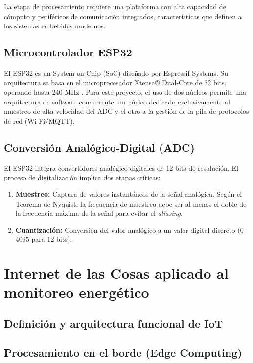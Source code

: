 ﻿\documentclass[12pt,openright,oneside]{report}
\theoremstyle{mytheoremstyle}
\theoremstyle{mytheoremstyle}
\theoremstyle{myproblemstyle}
\begin{document}
La etapa de procesamiento requiere una plataforma con alta capacidad de cómputo y periféricos de comunicación integrados, características que definen a los sistemas embebidos modernos.

\subsection{Microcontrolador ESP32}
El ESP32 es un System-on-Chip (SoC) diseñado por Espressif Systems. Su arquitectura se basa en el microprocesador Xtensa® Dual-Core de 32 bits, operando hasta 240 MHz \cite{esp32_datasheet}. Para este proyecto, el uso de dos núcleos permite una arquitectura de software concurrente: un núcleo dedicado exclusivamente al muestreo de alta velocidad del ADC y el otro a la gestión de la pila de protocolos de red (Wi-Fi/MQTT).

\subsection{Conversión Analógico-Digital (ADC)}
El ESP32 integra convertidores analógico-digitales de 12 bits de resolución. El proceso de digitalización implica dos etapas críticas:
\begin{enumerate}
    \item \textbf{Muestreo:} Captura de valores instantáneos de la señal analógica. Según el Teorema de Nyquist, la frecuencia de muestreo debe ser al menos el doble de la frecuencia máxima de la señal para evitar el \textit{aliasing}.
    \item \textbf{Cuantización:} Conversión del valor analógico a un valor digital discreto (0-4095 para 12 bits).
\end{enumerate}


\section{Internet de las Cosas aplicado al monitoreo energético}
\label{sec:iot_monitoreo}

\subsection{Definición y arquitectura funcional de IoT}
\subsection{Procesamiento en el borde (Edge Computing)}
\end{document}
